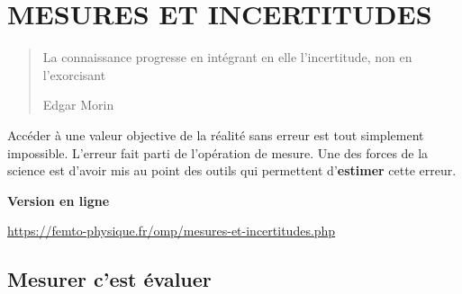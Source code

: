 \setchapterpreamble[u]{\margintoc}
\chapter{MESURES ET INCERTITUDES}


\blockquote[Edgar Morin]{La connaissance progresse en intégrant en elle l'incertitude, non en l'exorcisant}

Accéder à une valeur objective de la réalité sans erreur est tout simplement impossible. L'erreur fait parti de l'opération de mesure. Une des forces de la science est d'avoir mis au point des outils qui permettent d'\textbf{estimer} cette erreur.

\begin{center}
\textbf{Version en ligne}

\url{https://femto-physique.fr/omp/mesures-et-incertitudes.php}
\end{center}





\section{Mesurer c'est évaluer}%

